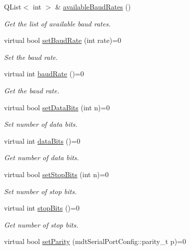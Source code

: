 \begin{DoxyCompactItemize}
\item 
QList$<$ int $>$ \& \hyperlink{classmdt_abstract_serial_port_aecd76bff0f93cb86c3bbfd73e3776032}{availableBaudRates} ()
\begin{DoxyCompactList}\small\item\em Get the list of available baud rates. \end{DoxyCompactList}\item 
virtual bool \hyperlink{classmdt_abstract_serial_port_ae250b30c1db5652bd2abe2caf1c9d5c7}{setBaudRate} (int rate)=0
\begin{DoxyCompactList}\small\item\em Set the baud rate. \end{DoxyCompactList}\item 
virtual int \hyperlink{classmdt_abstract_serial_port_ad9f5b7e939c60cd3766d2bf76df4af4b}{baudRate} ()=0
\begin{DoxyCompactList}\small\item\em Get the baud rate. \end{DoxyCompactList}\item 
virtual bool \hyperlink{classmdt_abstract_serial_port_a323e590d6ead87033985ffff1ecfae81}{setDataBits} (int n)=0
\begin{DoxyCompactList}\small\item\em Set number of data bits. \end{DoxyCompactList}\item 
virtual int \hyperlink{classmdt_abstract_serial_port_a63e2a14c416d9c3516ec74f5e37f4cc7}{dataBits} ()=0
\begin{DoxyCompactList}\small\item\em Get number of data bits. \end{DoxyCompactList}\item 
virtual bool \hyperlink{classmdt_abstract_serial_port_a164c7be802a04805e5b401fc5011208b}{setStopBits} (int n)=0
\begin{DoxyCompactList}\small\item\em Set number of stop bits. \end{DoxyCompactList}\item 
virtual int \hyperlink{classmdt_abstract_serial_port_abae48c24634c3e2d298f1cff98b250ed}{stopBits} ()=0
\begin{DoxyCompactList}\small\item\em Get number of stop bits. \end{DoxyCompactList}\item 
virtual bool \hyperlink{classmdt_abstract_serial_port_ac9c6990ac9861f21dcfe27c989b78545}{setParity} (mdtSerialPortConfig::parity\_\-t p)=0

\end{DoxyCompactItemize}
